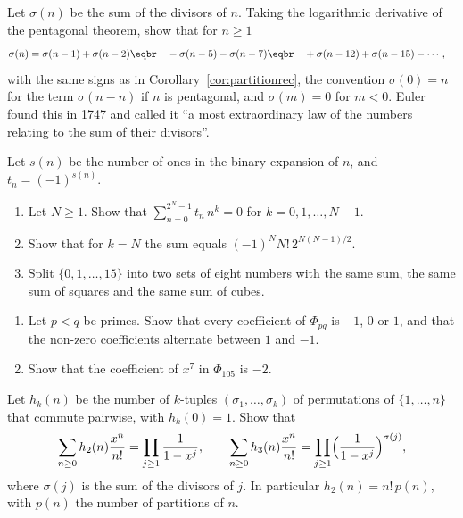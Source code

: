 \begin{exercise}[$\star\star\star$]\label{ex:sigma}
Let $\sigma(n)$ be the sum of the divisors of $n$. Taking the logarithmic derivative of the pentagonal theorem, show
that for $n\ge1$
\[
\begin{aligned}\sigma(n)&=\sigma(n-1)+\sigma(n-2)\eqbr\quad-\sigma(n-5)-\sigma(n-7)\eqbr\quad+\sigma(n-12)+\sigma(n-15)-\cdots,\end{aligned}
\]
with the same signs as in Corollary~\ref{cor:partitionrec}, the convention $\sigma(0)=n$ for the term $\sigma(n-n)$
if $n$ is pentagonal, and $\sigma(m)=0$ for $m<0$. Euler found this in 1747 and called it ``a most extraordinary law of the
numbers relating to the sum of their divisors''.
\end{exercise}

\begin{exercise}[$\star\star$]\label{pb:prouhet}
Let $s(n)$ be the number of ones in the binary expansion of $n$, and $t_n=(-1)^{s(n)}$.
\begin{enumerate}[label=(\alph*)]
\item Let $N\ge1$. Show that $\sum_{n=0}^{2^N-1}t_n\,n^k=0$ for $k=0,1,\dots,N-1$.
\item Show that for $k=N$ the sum equals $(-1)^NN!\,2^{N(N-1)/2}$.
\item Split $\{0,1,\dots,15\}$ into two sets of eight numbers with the same sum, the same sum of squares and the same sum
of cubes.
\end{enumerate}
\end{exercise}

\begin{exercise}[$\star\star\star$]\label{pb:phipq}
\begin{enumerate}[label=(\alph*)]
\item Let $p<q$ be primes. Show that every coefficient of $\Phi_{pq}$ is $-1$, $0$ or $1$, and that the non-zero
coefficients alternate between $1$ and $-1$.
\item Show that the coefficient of $x^7$ in $\Phi_{105}$ is $-2$.
\end{enumerate}
\end{exercise}

\begin{exercise}[$\star\star\star$]\label{pb:commuting}
Let $h_k(n)$ be the number of $k$-tuples $(\sigma_1,\dots,\sigma_k)$ of permutations of $\{1,\dots,n\}$ that commute pairwise,
with $h_k(0)=1$. Show that
\[
\sum_{n\ge0}h_2(n)\frac{x^n}{n!}=\prod_{j\ge1}\frac1{1-x^j},\qquad\sum_{n\ge0}h_3(n)\frac{x^n}{n!}=\prod_{j\ge1}\Bigl(\frac1{1-x^j}\Bigr)^{\sigma(j)},
\]
where $\sigma(j)$ is the sum of the divisors of $j$. In particular $h_2(n)=n!\,p(n)$, with $p(n)$ the number of partitions of $n$.
\end{exercise}


